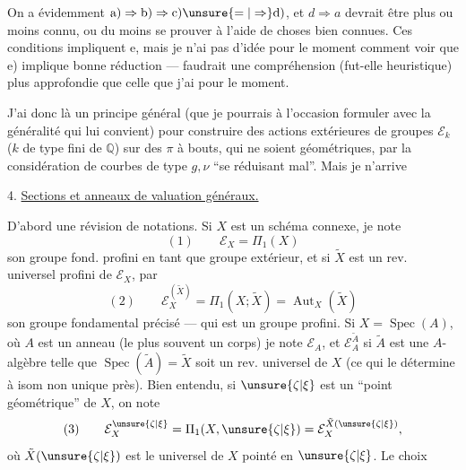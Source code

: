 
On a évidemment $\mathrm{a)}\Rightarrow\mathrm{b)}\Rightarrow\mathrm{c)}\unsure{=|\Rightarrow}\mathrm{d)}$,
et $d\Rightarrow a$ devrait être plus ou moins
connu, ou du moins se prouver à
l'aide de choses bien connues. Ces
conditions impliquent e, mais je n'ai
pas d'idée pour le moment comment
voir que e) implique bonne réduction ---
faudrait une compréhension (fut-elle
heuristique) plus approfondie que celle
que j'ai pour le moment.

J'ai donc là un principe général
(que je pourrais à l'occasion formuler
avec la généralité qui lui convient) pour
construire des actions extérieures 
de groupes $\mathcal E_k$ ($k$  de type fini
de $\mathbb{Q}$) sur des $\pi$ à bouts, qui
ne soient géométriques, par  la
considération de courbes de type $g,\nu$
``se réduisant mal''. Mais je n'arrive

4. \uline{Sections  et anneaux de valuation généraux.}

D'abord une révision de notations. Si $X$ est un schéma connexe, je note 
\[
(1)\qquad \mathcal E_X=\Pi_1(X)
\]
son groupe fond. profini en tant que groupe extérieur, et si $\tilde X$ est un rev. universel profini de $\mathcal E_X$, par
\[
(2)\qquad \mathcal E_X^{(\tilde X)}=\Pi_1(X;\tilde X)=\operatorname{Aut}_X(\tilde X)
\]
son groupe fondamental précisé --- qui est un groupe profini. Si $X=\operatorname{Spec}(A)$, où $A$ est un anneau (le plus souvent un corps) je note $\mathcal E_A$, et $\mathcal E_A^{\tilde A}$  si $\tilde A$ est une $A$-algèbre telle que $\operatorname{Spec}(\tilde A)=\tilde X$ soit un rev. universel de $X$ (ce qui le détermine à isom non unique près). Bien entendu, si $\unsure{\zeta|\xi}$ est un ``point géométrique'' de $X$, on note
\[
(3)\qquad \mathcal E_X^{\unsure{\zeta|\xi}}=\Pi_1(X,\unsure{\zeta|\xi})=\mathcal E_X^{\tilde X(\unsure{\zeta|\xi})},
\]
où $\tilde X(\unsure{\zeta|\xi})$ est le  universel de $X$ pointé en $\unsure{\zeta|\xi}$. Le choix

